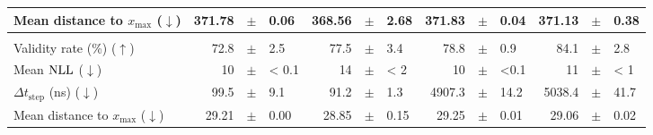 \documentclass[../main.tex]{subfiles}
\begin{document}
\begin{adjustwidth}{-2.7in}{-3in}
\begin{center}
\begin{tabular}{lrllrllrllrll}
			Mean distance to $x_\text{max}$ ($\downarrow$) & 371.78                                     & $\pm$                                                             & 0.06                   & 368.56                  & $\pm$ & 2.68    & 371.83 & $\pm$ & 0.04  & 371.13  & $\pm$ & 0.38    \\
			\midrule
			                                               & \multicolumn{12}{c}{\WineQuality}                                                                                                                                                                                                        \\
			\cmidrule(lr){2-13}
			Validity rate (\%) ($\uparrow$)                & 72.8                                       & $\pm$                                                             & 2.5                    & 77.5                    & $\pm$ & 3.4     & 78.8   & $\pm$ & 0.9   & 84.1    & $\pm$ & 2.8     \\
			Mean $\text{NLL}$ ($\downarrow$)                     & 10                                         & $\pm$                                                             & < 0.1                  & 14                      & $\pm$ & < 2     & 10     & $\pm$ & <0.1  & 11      & $\pm$ & < 1     \\
			$\Delta t_\text{step}$ (ns) ($\downarrow$)     & 99.5                                       & $\pm$                                                             & 9.1                    & 91.2                    & $\pm$ & 1.3     & 4907.3 & $\pm$ & 14.2  & 5038.4  & $\pm$ & 41.7    \\
			Mean distance to $x_\text{max}$ ($\downarrow$) & 29.21                                      & $\pm$                                                             & 0.00                   & 28.85                   & $\pm$ & 0.15    & 29.25  & $\pm$ & 0.01  & 29.06   & $\pm$ & 0.02    \\
			\bottomrule
		\end{tabular}
	\end{center}
\end{adjustwidth}
\end{document}
